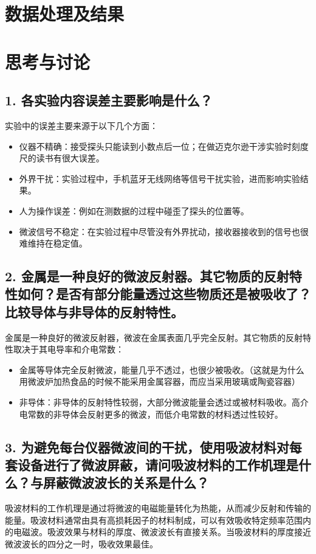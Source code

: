 \documentclass[zihao=5, UTF8]{article}
\theoremstyle{MyLineTheoremStyle} %
\theoremstyle{MyBlockTheoremStyle} %
\theoremstyle{MySubsubsectionStyle} %
\begin{document}
\section{数据处理及结果}


\section{思考与讨论}
\subsection*{1. 各实验内容误差主要影响是什么？}
实验中的误差主要来源于以下几个方面：
\begin{itemize}
    \item 仪器不精确：接受探头只能读到小数点后一位；在做迈克尔逊干涉实验时刻度尺的读书有很大误差。
    \item 外界干扰：实验过程中，手机蓝牙无线网络等信号干扰实验，进而影响实验结果。
    \item 人为操作误差：例如在测数据的过程中碰歪了探头的位置等。
    \item 微波信号不稳定：在实验过程中尽管没有外界扰动，接收器接收到的信号也很难维持在稳定值。
\end{itemize}

\subsection*{2. 金属是一种良好的微波反射器。其它物质的反射特性如何？是否有部分能量透过这些物质还是被吸收了？比较导体与非导体的反射特性。}
金属是一种良好的微波反射器，微波在金属表面几乎完全反射。其它物质的反射特性取决于其电导率和介电常数：
\begin{itemize}
    \item 金属等导体完全反射微波，能量几乎不透过，也很少被吸收。（这就是为什么用微波炉加热食品的时候不能采用金属容器，而应当采用玻璃或陶瓷容器）
    \item 非导体：非导体的反射特性较弱，大部分微波能量会透过或被材料吸收。高介电常数的非导体会反射更多的微波，而低介电常数的材料透过性较好。
\end{itemize}

\subsection*{3. 为避免每台仪器微波间的干扰，使用吸波材料对每套设备进行了微波屏蔽，请问吸波材料的工作机理是什么？与屏蔽微波波长的关系是什么？}
吸波材料的工作机理是通过将微波的电磁能量转化为热能，从而减少反射和传输的能量。吸波材料通常由具有高损耗因子的材料制成，可以有效吸收特定频率范围内的电磁波。吸波效果与材料的厚度、微波波长有直接关系。当吸波材料的厚度接近微波波长的四分之一时，吸收效果最佳。
\end{document}
